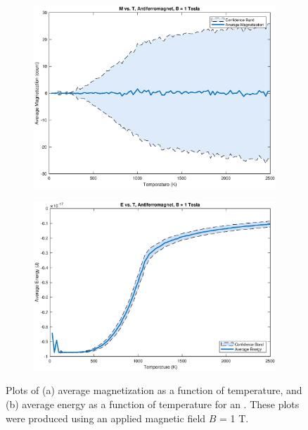 \documentclass[12pt]{article}
\begin{document}
\begin{figure}[!h]
\begin{subfigure}{0.5\textwidth}
\includegraphics[width=\linewidth]{./Antiferrographs/antiferroMvsT.eps}
\caption{\label{antiferroMvsT}}
\end{subfigure}
\begin{subfigure}{0.5\textwidth}
\includegraphics[width=\linewidth]{./Antiferrographs/antiferroEvsT.eps}
\caption{\label{antiferroEvsT}}
\end{subfigure}
\caption{Plots of (a) average magnetization as a function of temperature, and (b) average energy as a function of temperature for an .  These plots were produced using an applied magnetic field $B$ = 1 T.} 
\end{figure} 
\end{document}
